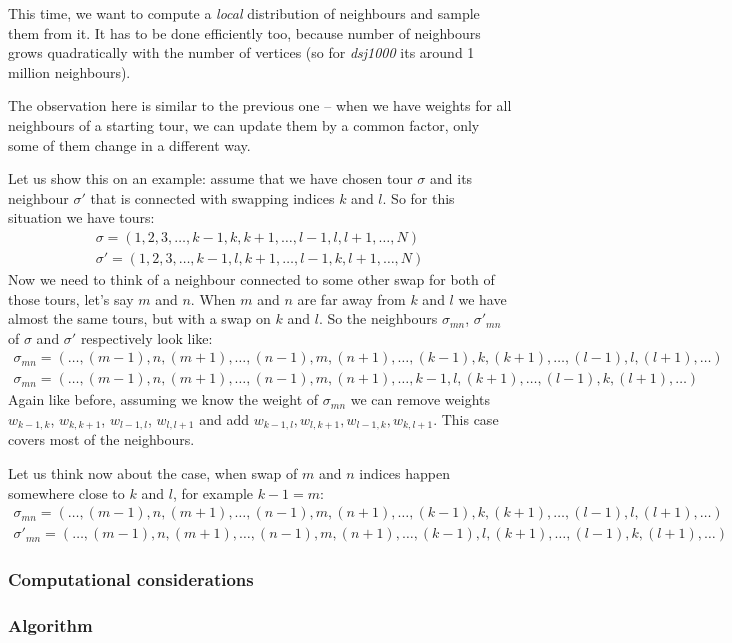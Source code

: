 	This time, we want to compute a \textit{local} distribution of neighbours and sample them from it. It has to be done efficiently too, because number of neighbours grows quadratically with the number of vertices (so for \textit{dsj1000} its around 1 million neighbours).
	
	The observation here is similar to the previous one -- when we have weights for all neighbours of a starting tour, we can update them by a common factor, only some of them change in a different way.
	
	Let us show this on an example: assume that we have chosen tour $\sigma$ and its neighbour $\sigma'$ that is connected with swapping indices $k$ and $l$. So for this situation we have tours:
	\begin{align*}
		\sigma = (1, 2, 3, \ldots, k-1, k, k+1, \ldots, l-1, l, l+1, \ldots, N) \\
		\sigma' = (1, 2, 3, \ldots, k-1, l, k+1, \ldots, l-1, k, l+1, \ldots, N)
	\end{align*}
	Now we need to think of a neighbour connected to some other swap for both of those tours, let's say $m$ and $n$. When $m$ and $n$ are far away from $k$ and $l$ we have almost the same tours, but with a swap on $k$ and $l$. So the neighbours $\sigma_{mn}$, $\sigma'_{mn}$ of $\sigma$ and $\sigma'$ respectively look like: 
	\begin{align*}
		\sigma_{mn} = (\ldots, (m-1), n, (m+1), \ldots, (n-1), m,( n+1), \ldots, (k-1), k, (k+1), \ldots, (l-1), l, (l+1), \ldots) \\
		\sigma_{mn} = (\ldots, (m-1), n, (m+1), \ldots, (n-1), m, (n+1), \ldots, k-1, l, (k+1), \ldots, (l-1), k, (l+1), \ldots)
	\end{align*}
	Again like before, assuming we know the weight of $\sigma_{mn}$ we can remove weights $w_{k-1, k}$, $w_{k, k+1}$, $w_{l-1, l}$, $w_{l, l+1}$ and add $w_{k-1, l}, w_{l, k+1}, w_{l-1, k}, w_{k, l+1}$. This case covers most of the neighbours. 
	
	Let us think now about the case, when swap of $m$ and $n$ indices happen somewhere close to $k$ and $l$, for example $k-1 = m$:
	\begin{align*}
		\sigma_{mn} = (\ldots, (m-1), n, (m+1), \ldots, (n-1), m,( n+1), \ldots, (k-1), k, (k+1), \ldots, (l-1), l, (l+1), \ldots) \\
		\sigma'_{mn} = (\ldots, (m-1), n, (m+1), \ldots, (n-1), m, (n+1), \ldots, (k-1), l, (k+1), \ldots, (l-1), k, (l+1), \ldots)
	\end{align*}
	
	\subsubsection{Computational considerations}
	
	\subsubsection{Algorithm}